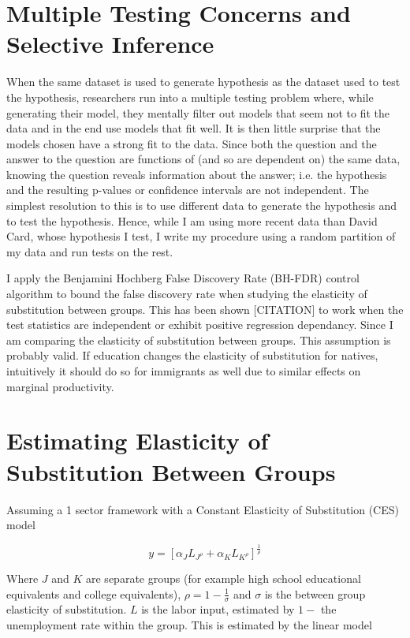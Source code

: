 \documentclass[11pt]{article}
\theoremstyle{definition}
\theoremstyle{remark}
\def\a{\alpha}
\def\r{\rho}
\def\s{\sigma}
\begin{document}
\section{Multiple Testing Concerns and Selective Inference}

When the same dataset is used to generate hypothesis as the dataset used to
test the hypothesis, researchers run into a multiple testing problem where, while
generating their model, they  mentally filter out models that seem not to fit the
data and in the end use models that fit well. It is then little surprise that the
models chosen have a strong fit to the data. Since both the question and the
answer to the question are functions of (and so are dependent on) the same data,
knowing the question reveals information about the answer; i.e. the hypothesis
and the resulting p-values or confidence intervals are not independent. The
simplest resolution to this is to use different data to generate the hypothesis
and to test the hypothesis. Hence, while I am using more recent data than David
Card, whose hypothesis I test, I write my procedure using a random partition of
my data and run tests on the rest.

I apply the Benjamini Hochberg False Discovery Rate (BH-FDR) control
algorithm to bound the false discovery rate when studying the elasticity of
substitution between groups. This has been shown [CITATION] to work when the
test statistics are independent or exhibit positive regression dependancy. Since
I am comparing the elasticity of substitution between groups. This assumption
is probably valid. If education changes the elasticity of substitution for
natives, intuitively it should do so for immigrants as well due to similar
effects on marginal productivity.


\section{Estimating Elasticity of Substitution Between Groups}

Assuming a 1 sector framework with a Constant Elasticity of Substitution (CES)
model

\begin{equation}
    y = [\a_J L_{J^\r} + \a_K L_{K^\r}]^{\frac 1\r}
\end{equation}

Where $J$ and $K$ are separate groups (for example high school educational
equivalents and college equivalents), $\r = 1-\frac1\s$ and $\s$ is the
between group elasticity of substitution.
$L$ is the labor input, estimated by $1-$ the unemployment rate within the group.
This is estimated by
the linear model
\end{document}
